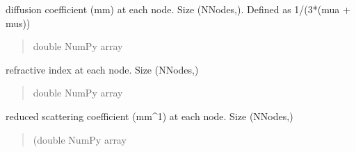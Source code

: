 \documentclass[letterpaper,10pt,english]{sphinxmanual}
\begin{document}
\begin{fulllineitems}
\begin{fulllineitems}
\begin{quote}
\begin{description}
\end{description}\end{quote}

\end{fulllineitems}


\begin{fulllineitems}
\label{\detokenize{_autosummary/nirfasterff.base.dcs_mesh.dcsmesh:nirfasterff.base.dcs_mesh.dcsmesh.kappa}}
\pysigstartsignatures
\pysigline
{}
\pysigstopsignatures
\sphinxAtStartPar
diffusion coefficient (mm) at each node. Size (NNodes,). Defined as 1/(3*(mua + mus))
\begin{quote}\begin{description}
\sphinxAtStartPar
double NumPy array

\end{description}\end{quote}

\end{fulllineitems}


\begin{fulllineitems}
\label{\detokenize{_autosummary/nirfasterff.base.dcs_mesh.dcsmesh:nirfasterff.base.dcs_mesh.dcsmesh.ri}}
\pysigstartsignatures
\pysigline
{}
\pysigstopsignatures
\sphinxAtStartPar
refractive index at each node. Size (NNodes,)
\begin{quote}\begin{description}
\sphinxAtStartPar
double NumPy array

\end{description}\end{quote}

\end{fulllineitems}


\begin{fulllineitems}
\label{\detokenize{_autosummary/nirfasterff.base.dcs_mesh.dcsmesh:nirfasterff.base.dcs_mesh.dcsmesh.mus}}
\pysigstartsignatures
\pysigline
{}
\pysigstopsignatures
\sphinxAtStartPar
reduced scattering coefficient (mm\textasciicircum{}\sphinxhyphen{}1) at each node. Size (NNodes,)
\begin{quote}\begin{description}
\sphinxAtStartPar
(double NumPy array


\end{description}
\end{quote}
\end{fulllineitems}
\end{fulllineitems}
\end{document}
